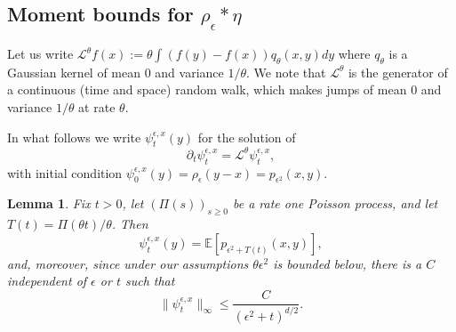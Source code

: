 \documentclass[12pt]{article}
\newtheorem{lemma}[theorem]{Lemma}
\newcommand{\IE}{\mathbb E}
\numberwithin{equation}{section}
\begin{document}
\subsection{Moment bounds for $\rho_\epsilon*\eta$}
\label{bounds on rhoepsilon}

Let us write $\mathcal{L}^\theta f(x) := \theta \int (f(y)-f(x))q_\theta(x,y) dy$ 
where $q_\theta$ is a Gaussian kernel of mean $0$ and variance $1/\theta$. 
We note that $\mathcal{L}^\theta$ is the generator of a continuous (time and 
space) random walk, which makes jumps of mean $0$ and variance $1/\theta$ at
rate $\theta$.

In what follows we write $\psi_t^{\epsilon, x}(y)$ for the solution of
\begin{equation}
    \partial_t \psi_t^{\epsilon,x}
    =
    \mathcal{L}^\theta \psi_t^{\epsilon, x},
    \label{AlmostHeatEquation}
\end{equation}
with initial condition 
$\psi_0^{\epsilon,x}(y) = \rho_\epsilon(y-x) =p_{\epsilon^2}(x,y)$.

\begin{lemma} \label{PsiBoundHS}
    Fix $t>0$,
    let $(\Pi(s))_{s \ge 0}$ be a rate one Poisson process,
    and let $T(t) = \Pi(\theta t) / \theta$.
    Then
    \[
        \psi^{\epsilon,x}_t(y)
        =
        \IE\left[ p_{\epsilon^2+T(t)}(x,y)\right],
    \]
    and, moreover,
    since under our assumptions $\theta \epsilon^2$ is bounded below,
    there is a $C$ independent of $\epsilon$ or $t$ such that
    \[
        \| \psi^{\epsilon,x}_t \|_\infty
        \leq
        \frac{C}{(\epsilon^2 + t)^{d/2}} .
    \]
\end{lemma}
\end{document}

